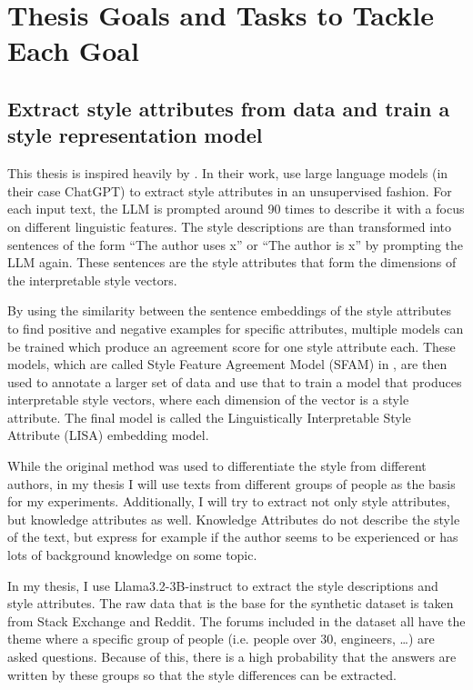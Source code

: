 
\section{Thesis Goals and Tasks to Tackle Each Goal}
  \subsection{Extract style attributes from data and train a style representation model}
  This thesis is inspired heavily by \citet{patelLearningInterpretableStyle2023}. In their work, \citeauthor{patelLearningInterpretableStyle2023} use large language models (in their case ChatGPT) to extract style attributes in an unsupervised fashion. For each input text, the LLM is prompted around 90 times to describe it with a focus on different linguistic features. The style descriptions are than transformed into sentences of the form \enquote{The author uses x} or \enquote{The author is x} by prompting the LLM again. These sentences are the style attributes that form the dimensions of the interpretable style vectors.

  By using the similarity between the sentence embeddings of the style attributes to find positive and negative examples for specific attributes, multiple models can be trained which produce an agreement score for one style attribute each. These models, which are called Style Feature Agreement Model (SFAM) in \citet{patelLearningInterpretableStyle2023}, are then used to annotate a larger set of data and use that to train a model that produces interpretable style vectors, where each dimension of the vector is a style attribute. The final model is called the Linguistically Interpretable Style Attribute (LISA) embedding model.
  
  While the original method was used to differentiate the style from different authors, in my thesis I will use texts from different groups of people as the basis for my experiments. Additionally, I will try to extract not only style attributes, but knowledge attributes as well. Knowledge Attributes do not describe the style of the text, but express for example if the author seems to be experienced or has lots of background knowledge on some topic.
  
  In my thesis, I use Llama3.2-3B-instruct %
  to extract the style descriptions and style attributes. The raw data that is the base for the synthetic dataset is taken from Stack Exchange and Reddit. The forums included in the dataset all have the theme where a specific group of people (i.e. people over 30, engineers, \ldots) are asked questions. Because of this, there is a high probability that the answers are written by these groups so that the style differences can be extracted.

